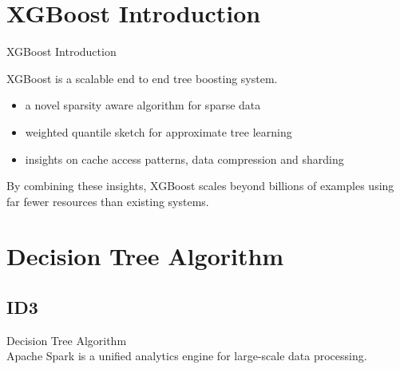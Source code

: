 \section{XGBoost Introduction}
\begin{frame}[plain,t]{XGBoost Introduction} %
	   \vspace{2ex}
    
    XGBoost\cite{Chen2016XGBoost} is a scalable end to end tree boosting system.
    
    \vspace{2ex}
    
      
    \begin{itemize}
        
        \item a novel sparsity aware algorithm for sparse data
        
        \item weighted quantile sketch for approximate tree learning
        
        \item insights on cache access patterns, data compression and sharding
        
    \end{itemize}

\vspace{2ex}

    By combining these insights, XGBoost scales beyond billions
    of examples using far fewer resources than existing systems.
   \end{frame}




\section{Decision Tree Algorithm}
\subsection{ID3}
\begin{frame}[plain,t]{Decision Tree Algorithm} %
     \\  \vspace{2ex}
    Apache Spark is a unified analytics engine for large-scale data processing.
    
    
    
    
\end{frame}

